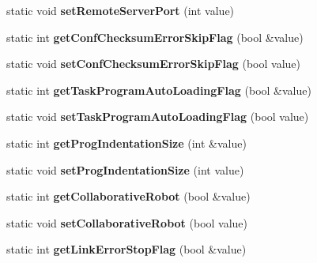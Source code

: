 \begin{DoxyCompactItemize}
\item 
\hypertarget{classAppConf_a74d61c8555d3095d596079cafe3ce82e}{static void {\bfseries set\-Remote\-Server\-Port} (int value)}\label{classAppConf_a74d61c8555d3095d596079cafe3ce82e}

\item 
\hypertarget{classAppConf_af953881135197c39249f70dd5b92abc1}{static int {\bfseries get\-Conf\-Checksum\-Error\-Skip\-Flag} (bool \&value)}\label{classAppConf_af953881135197c39249f70dd5b92abc1}

\item 
\hypertarget{classAppConf_a01c1631828fb88dfa9b17853f09eef54}{static void {\bfseries set\-Conf\-Checksum\-Error\-Skip\-Flag} (bool value)}\label{classAppConf_a01c1631828fb88dfa9b17853f09eef54}

\item 
\hypertarget{classAppConf_a8266766ccc98c2a09747fecc281b8802}{static int {\bfseries get\-Task\-Program\-Auto\-Loading\-Flag} (bool \&value)}\label{classAppConf_a8266766ccc98c2a09747fecc281b8802}

\item 
\hypertarget{classAppConf_a48ea087e9d0ebdddfa97a709585e3400}{static void {\bfseries set\-Task\-Program\-Auto\-Loading\-Flag} (bool value)}\label{classAppConf_a48ea087e9d0ebdddfa97a709585e3400}

\item 
\hypertarget{classAppConf_a35960ce43bf8db5db49c7762fb7c8498}{static int {\bfseries get\-Prog\-Indentation\-Size} (int \&value)}\label{classAppConf_a35960ce43bf8db5db49c7762fb7c8498}

\item 
\hypertarget{classAppConf_ad74c288c5e38e27deb333c68362132fd}{static void {\bfseries set\-Prog\-Indentation\-Size} (int value)}\label{classAppConf_ad74c288c5e38e27deb333c68362132fd}

\item 
\hypertarget{classAppConf_ae5fd5d09d3840fcd11d0bd984cf2c465}{static int {\bfseries get\-Collaborative\-Robot} (bool \&value)}\label{classAppConf_ae5fd5d09d3840fcd11d0bd984cf2c465}

\item 
\hypertarget{classAppConf_aa3b654c2510a036cfc5c338c2e7418a9}{static void {\bfseries set\-Collaborative\-Robot} (bool value)}\label{classAppConf_aa3b654c2510a036cfc5c338c2e7418a9}

\item 
\hypertarget{classAppConf_a50e2ce4216c65afe87defa083e5d15dd}{static int {\bfseries get\-Link\-Error\-Stop\-Flag} (bool \&value)}\label{classAppConf_a50e2ce4216c65afe87defa083e5d15dd}


\end{DoxyCompactItemize}
